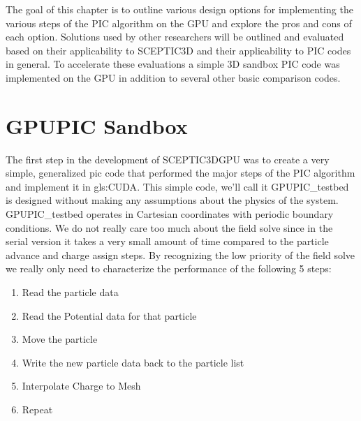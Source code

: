 The goal of this chapter is to outline various design options for implementing the various steps of the PIC algorithm on the GPU and explore the pros and cons of each option. Solutions used by other researchers will be outlined and evaluated based on their applicability to SCEPTIC3D and their applicability to PIC codes in general. To accelerate these evaluations a simple 3D sandbox PIC code was implemented on the GPU in addition to several other basic comparison codes. 



	\section{GPUPIC Sandbox}
The first step in the development of SCEPTIC3DGPU was to create a very simple, generalized pic code that performed the major steps of the PIC algorithm and implement it in \gls{gls:CUDA}. This simple code, we'll call it GPUPIC\_testbed is designed without making any assumptions about the physics of the system. GPUPIC\_testbed operates in Cartesian coordinates with periodic boundary conditions. We do not really care too much about the field solve since in the serial version it takes a very small amount of time compared to the particle advance and charge assign steps. By recognizing the low priority of the field solve we really only need to characterize the performance of the following 5 steps:


\begin{enumerate}\itemsep0pt \parskip0pt 
\item Read the particle data
\item Read the Potential data for that particle
\item Move the particle
\item Write the new particle data back to the particle list
\item Interpolate Charge to Mesh
\item Repeat
\end{enumerate}



